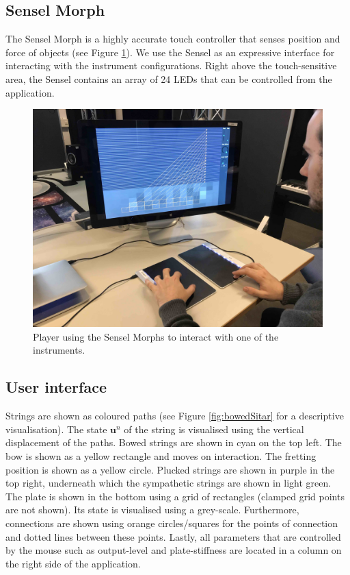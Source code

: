 \subsection{Sensel Morph}
The Sensel Morph is a highly accurate touch controller that senses position and force of objects \cite{sensel2018} (see Figure \ref{fig:sensel}). We use the Sensel as an expressive interface for interacting with the instrument configurations. Right above the touch-sensitive area, the Sensel contains an array of 24 LEDs that can be controlled from the application.
\begin{figure}[ht]\includegraphics[width=\paperFigWidth\textwidth]{figures/senselLQ.jpg}\centering
\caption{Player using the Sensel Morphs to interact with one of the instruments.\label{fig:sensel}}
\end{figure}
\subsection{User interface}
Strings are shown as coloured paths (see Figure \ref{fig:bowedSitar} for a descriptive visualisation). The state $\mathbf{u}^n$ of the string is visualised using the vertical displacement of the paths. Bowed strings are shown in cyan on the top left. The bow is shown as a yellow rectangle and moves on interaction. The fretting position is shown as a yellow circle. Plucked strings are shown in purple in the top right, underneath which the sympathetic strings are shown in light green. The plate is shown in the bottom using a grid of rectangles (clamped grid points are not shown). Its state is visualised using a grey-scale. Furthermore, connections are shown using orange circles/squares for the points of connection and dotted lines between these points. Lastly, all parameters that are controlled by the mouse such as output-level and plate-stiffness are located in a column on the right side of the application.

